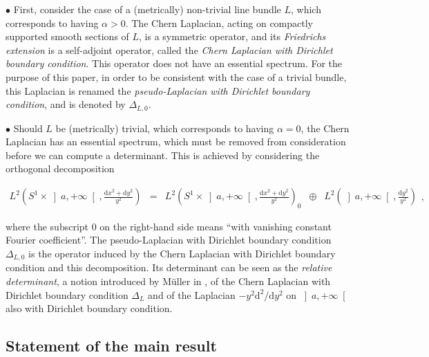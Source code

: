\documentclass{jams-l}
\theoremstyle{definition}
\theoremstyle{remark}
\numberwithin{equation}{section}
\begin{document}
            \medskip
            
            \hspace{10pt} $\bullet$ First, consider the case of a (metrically) non-trivial line bundle $L$, which corresponds to having $\alpha > 0$. The Chern Laplacian, acting on compactly supported smooth sections of $L$, is a symmetric operator, and its \textit{Friedrichs extension} is a self-adjoint operator, called the \textit{Chern Laplacian with Dirichlet boundary condition}. This operator does not have an essential spectrum. For the purpose of this paper, in order to be consistent with the case of a trivial bundle, this Laplacian is renamed the \textit{pseudo-Laplacian with Dirichlet boundary condition}, and is denoted by $\Delta_{L,0}$.
            
            \medskip
            
            \hspace{10pt} $\bullet$ Should $L$ be (metrically) trivial, which corresponds to having $\alpha = 0$, the Chern Laplacian has an essential spectrum, which must be removed from consideration before we can compute a determinant. This is achieved by considering the orthogonal decomposition
            
            \[ \begin{array}{lll}
                    \scriptstyle L^2 \left( S^1 \times \left] a, +\infty \right[, \frac{\mathrm{d}x^2 + \mathrm{d}y^2}{y^2} \right) & \scriptstyle = & \scriptstyle L^2 \left( S^1 \times \left] a, +\infty \right[, \frac{\mathrm{d}x^2 + \mathrm{d}y^2}{y^2} \right)_0 \; \; \oplus \; \; L^2 \left( \left] a, + \infty \right[, \frac{\mathrm{d}y^2}{y^2} \right)
                \end{array} , \]
            
            \noindent where the subscript $0$ on the right-hand side means ``with vanishing constant Fourier coefficient''. The pseudo-Laplacian with Dirichlet boundary condition $\Delta_{L,0}$ is the operator induced by the Chern Laplacian with Dirichlet boundary condition and this decomposition. Its determinant can be seen as the \textit{relative determinant}, a notion introduced by Müller in \cite{MR1617554}, of the Chern Laplacian with Dirichlet boundary condition $\Delta_L$ and of the Laplacian $-y^2 \mathrm{d}^2/\mathrm{d}y^2$ on $\left] a, + \infty \right[$ also with Dirichlet boundary condition.
            
    

    \subsection{Statement of the main result}
    
\end{document}
